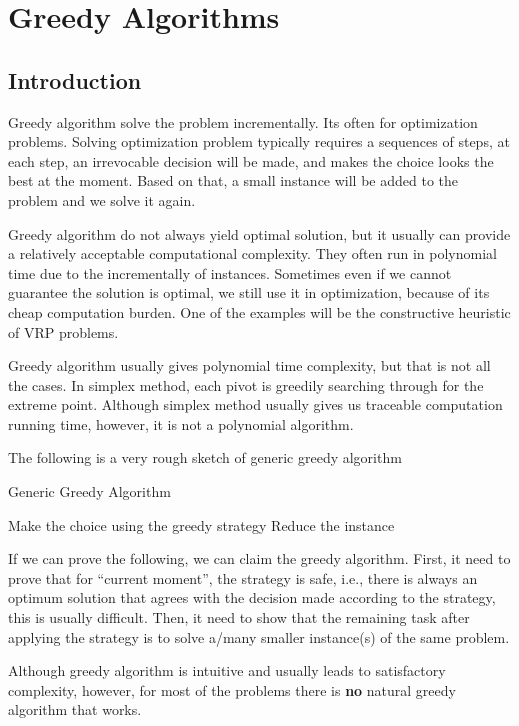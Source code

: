 			\section{Greedy Algorithms}
				\subsection{Introduction}
					Greedy algorithm solve the problem incrementally. Its often for optimization problems. Solving optimization problem typically requires a sequences of steps, at each step, an irrevocable decision will be made, and makes the choice looks the best at the moment. Based on that, a small instance will be added to the problem and we solve it again.

					Greedy algorithm do not always yield optimal solution, but it usually can provide a relatively acceptable computational complexity. They often run in polynomial time due to the incrementally of instances. Sometimes even if we cannot guarantee the solution is optimal, we still use it in optimization, because of its cheap computation burden. One of the examples will be the constructive heuristic of VRP problems.

					Greedy algorithm usually gives polynomial time complexity, but that is not all the cases. In simplex method, each pivot is greedily searching through for the extreme point. Although simplex method usually gives us traceable computation running time, however, it is not a polynomial algorithm.

					The following is a very rough sketch of generic greedy algorithm
					\begin{algorithm}[!ht]
						\caption{Generic Greedy Algorithm}
						\begin{algorithmic}[1]
								\State Make the choice using the greedy strategy
								\State Reduce the instance
							\EndWhile
						\end{algorithmic}
					\end{algorithm}

					If we can prove the following, we can claim the greedy algorithm. First, it need to prove that for ``current moment'', the strategy is safe, i.e., there is always an optimum solution that agrees with the decision made according to the strategy, this is usually difficult. Then, it need to show that the remaining task after applying the strategy is to solve a/many smaller instance(s) of the same problem.

					Although greedy algorithm is intuitive and usually leads to satisfactory complexity, however, for most of the problems there is \textbf{no} natural greedy algorithm that works.
